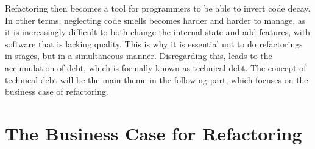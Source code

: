 Refactoring then becomes a tool for programmers to be able to invert code decay.
In other terms, 
	neglecting code smells becomes harder and harder to manage, 
	as it is increasingly difficult to both change the internal state and 
	add features, with software that is lacking quality. 
This is why it is essential not to do refactorings in stages, 
	but in a simultaneous manner.
Disregarding this, 
	leads to the accumulation of debt, 
	which is formally known as technical debt. 
The concept of technical debt will be the main theme 
	in the following part, 
	which focuses on the business case of refactoring.



\section{The Business Case for Refactoring}
\label{sec:Business}
